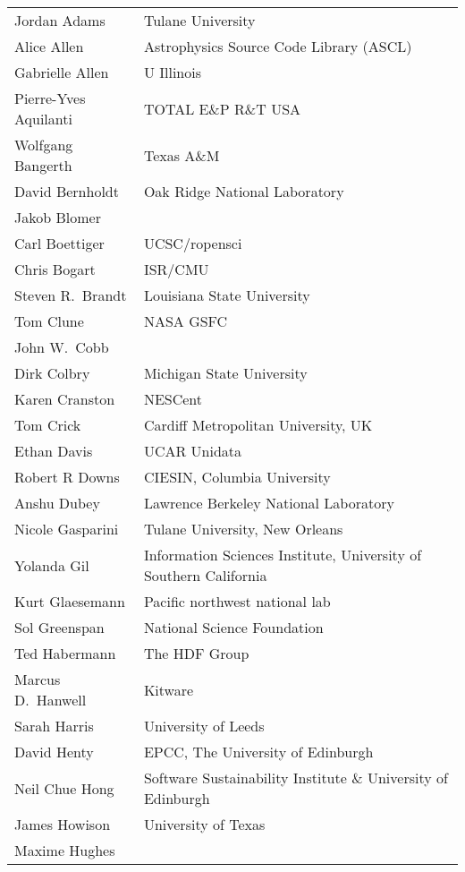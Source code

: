 \documentclass[11pt, oneside]{amsart}
\begin{document}
{\small
\begin{longtable}{ll}
   Jordan Adams          &  Tulane University
\\ Alice Allen           &  Astrophysics Source Code Library (ASCL)
\\ Gabrielle Allen       &  U Illinois
\\ Pierre-Yves Aquilanti &  TOTAL E\&P R\&T USA
\\ Wolfgang Bangerth & Texas A\&M
\\ David Bernholdt       &  Oak Ridge National Laboratory
\\ Jakob Blomer
\\ Carl Boettiger        &  UCSC/ropensci
\\ Chris Bogart          &  ISR/CMU
\\ Steven R.~Brandt      &  Louisiana State University
\\ Tom Clune             &  NASA GSFC
\\ John W.~Cobb
\\ Dirk Colbry           &  Michigan State University
\\ Karen Cranston        &  NESCent
\\ Tom Crick             &  Cardiff Metropolitan University, UK
\\ Ethan Davis           &  UCAR Unidata
\\ Robert R Downs        &  CIESIN, Columbia University
\\ Anshu Dubey           &  Lawrence Berkeley National Laboratory
\\ Nicole Gasparini      &  Tulane University, New Orleans
\\ Yolanda Gil           &  Information Sciences Institute, University of Southern California
\\ Kurt Glaesemann       &  Pacific northwest national lab
\\ Sol Greenspan         &  National Science Foundation
\\ Ted Habermann         &  The HDF Group
\\ Marcus D.~Hanwell     &  Kitware
\\ Sarah Harris          &  University of Leeds
\\ David Henty           &  EPCC, The University of Edinburgh
\\ Neil Chue Hong        &  Software Sustainability Institute \& University of Edinburgh
\\ James Howison         &  University of Texas
\\ Maxime Hughes

\end{longtable}}
\end{document}
